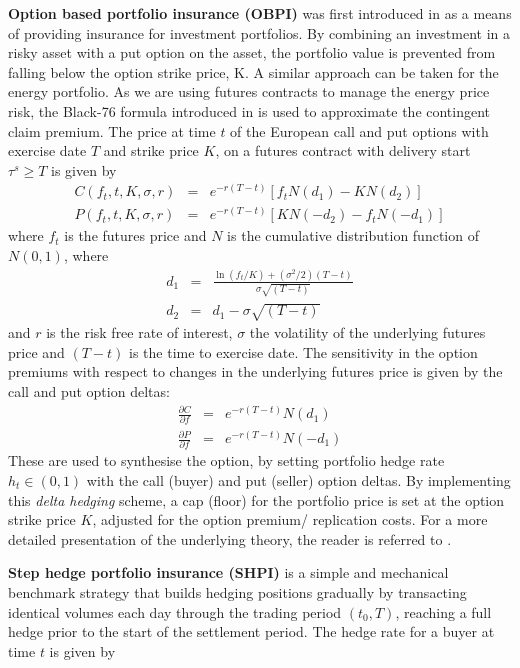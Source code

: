 \textbf{Option based portfolio insurance (OBPI)} was first introduced in \citet{leland1976evolution} as a means of providing insurance for investment portfolios. By combining an investment in a risky asset with a put option on the asset, the portfolio value is prevented from falling below the option strike price, K. A similar approach can be taken for the energy portfolio. As we are using futures contracts to manage the energy price risk, the Black-76 formula introduced in \citet{black1976pricing} is used to approximate the contingent claim premium. The price at time $t$ of the European call and put options with exercise date $T$ and strike price $K$, on a futures contract with delivery start $\tau^s \geq T$ is given by
\begin{eqnarray}
C(f_t, t, K, \sigma, r) &=& e^{-r (T-t)} [f_t N(d_1) - KN(d_2)]\\
P(f_t, t, K, \sigma, r) &=& e^{-r (T-t)} [KN(-d_2) - f_t N(-d_1)]
\end{eqnarray}
where $f_t$ is the futures price and $N$ is the cumulative distribution function of $N(0,1)$, where
\begin{eqnarray}
d_1 &=& \frac{\ln(f_t/K) + (\sigma^2/2)(T-t)}{\sigma\sqrt{(T-t)}}\\
d_2 &=& d_1 - \sigma\sqrt{(T-t)}
\end{eqnarray}
and $r$ is the risk free rate of interest, $\sigma$ the volatility of the underlying futures price and $(T-t)$ is the time to exercise date. The sensitivity in the option premiums with respect to changes in the underlying futures price is given by the call and put option deltas:
\begin{eqnarray}
\frac{\partial C}{\partial f} &=& e^{-r(T-t)}N(d_1)\\
\frac{\partial P}{\partial f} &=& e^{-r(T-t)}N(-d_1)
\end{eqnarray}
These are used to synthesise the option, by setting portfolio hedge rate $h_t\in(0,1)$ with the call (buyer) and put (seller) option deltas. By implementing this \textit{delta hedging} scheme, a cap (floor) for the portfolio price is set at the option strike price $K$, adjusted for the option premium/ replication costs. For a more detailed presentation of the underlying theory, the reader is referred to \citet{bjork2009arbitrage}.

\textbf{Step hedge portfolio insurance (SHPI)} is a simple and mechanical benchmark strategy that builds hedging positions gradually by transacting identical volumes each day through the trading period $(t_0, T)$, reaching a full hedge prior to the start of the settlement period. The hedge rate for a buyer at time $t$ is given by

